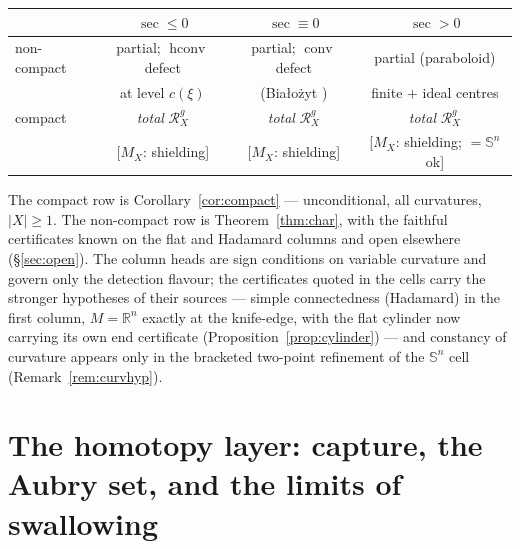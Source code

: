 \documentclass[11pt]{article}
\theoremstyle{remark}
\newcommand{\R}{\mathbb{R}}
\newcommand{\X}{X}
\newcommand{\Mx}{M_{\X}}
\newcommand{\Rg}{\mathcal{R}^{g}_{\X}}
\newcommand{\conv}{\operatorname{conv}}
\newcommand{\hconv}{\operatorname{hconv}}
\newcommand{\sect}{\operatorname{sec}}
\newcommand{\Sn}{\mathbb{S}^{n}}
\begin{document}
\begin{center}
\begin{tabular}{l|ccc}
\toprule
 & $\sect\le0$ & $\sect\equiv0$ & $\sect>0$\\
\midrule
non-compact & partial; $\hconv$ defect & partial; $\conv$ defect
 & partial (paraboloid)\\
 & at level $c(\xi)$ \cite{R3} & (Bia\l{}o\.zyt \cite{Bia})
 & finite $+$ ideal centres\\
\midrule
compact & \emph{total} $\Rg$ & \emph{total} $\Rg$
 & \emph{total} $\Rg$\\
 & [$\Mx$: shielding] & [$\Mx$: shielding] & [$\Mx$: shielding;
 $=\Sn$ ok]\\
\bottomrule
\end{tabular}
\end{center}

\noindent The compact row is Corollary~\ref{cor:compact} ---
unconditional, all curvatures, $|\X|\ge1$. The non-compact row is
Theorem~\ref{thm:char}, with the faithful certificates known on the
flat and Hadamard columns and open elsewhere (\S\ref{sec:open}). The
column heads are sign conditions on variable curvature and govern only
the detection flavour; the certificates quoted in the cells carry the
stronger hypotheses of their sources --- simple connectedness
(Hadamard) in the first column, $M=\R^{n}$ exactly at the knife-edge,
with the flat cylinder now carrying its own end certificate
(Proposition~\ref{prop:cylinder}) --- and constancy of curvature
appears only in the bracketed two-point refinement of the $\Sn$ cell
(Remark~\ref{rem:curvhyp}).

\section{The homotopy layer: capture, the Aubry set, and the limits
of swallowing}\label{sec:homotopy}
\end{document}
